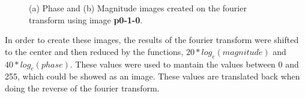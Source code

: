\documentclass[12pt,a4paper]{article}
\begin{document}
\begin{figure}[!h]
	\centering
	\quad
	\caption{(a) Phase and (b) Magnitude images created on the fourier transform using image \textbf{p0-1-0}.}
	\label{fig:mag-phase}
\end{figure}

In order to create these images, the results of the fourier transform were shifted to the center and then reduced by the functions, $20*log_e(magnitude)$ and $40*log_e(phase)$. These values were used to mantain the values between 0 and 255, which could be showed as an image. These values are translated back when doing the reverse of the fourier transform. \\
\end{document}
